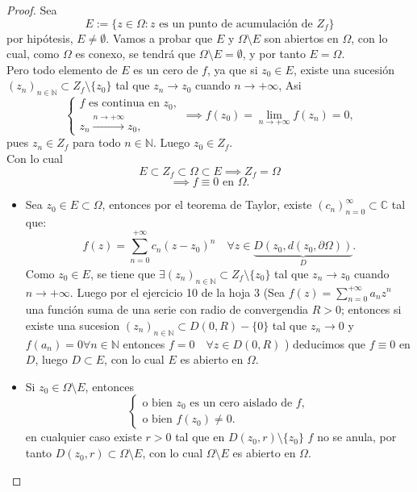 \begin{proof}
    Sea 
    \[
        E := \{z \in \Omega : z \text{ es un punto de acumulación de } Z_f \}
    \]
    por hipótesis, $E \neq \emptyset$. Vamos a probar que $E$ y $\Omega \setminus E$ son abiertos en $\Omega$, con lo cual, como $\Omega$ es conexo, se tendrá que $\Omega \setminus E = \emptyset$, y por tanto $E = \Omega$.\\
    Pero todo elemento de $E$ es un cero de $f$, ya que si $z_0 \in E$, existe una sucesión $(z_n)_{n \in \mathbb{N}} \subset Z_f \setminus \{ z_0 \}$ tal que $z_n \to z_0$ cuando $n \to +\infty$, Asi
    \[
        \begin{cases}
            f \text{ es continua en } z_0, \\
            z_n \xrightarrow{n \to +\infty} z_0, 
        \end{cases} \implies f(z_0) = \lim_{n \to +\infty} f(z_n) = 0,
    \]
    pues $z_n \in Z_f$ para todo $n \in \mathbb{N}$. Luego $z_0 \in Z_f$.\\
    Con lo cual 
    \[
        E \subset Z_f \subset \Omega \subset E \implies Z_f = \Omega
    \]
    \[
        \implies f \equiv 0 \text{ en } \Omega.
    \]
    \begin{itemize}
        \item Sea $z_0 \in E \subset \Omega$, entonces por el teorema de Taylor, existe $(c_n)_{n = 0}^{\infty} \subset \mathbb{C}$ tal que:
        \[
            f(z) = \sum_{n=0}^{+\infty} c_n (z - z_0)^n \quad \forall z \in \underbrace{D(z_0, d(z_0, \partial \Omega))}_{D}.
        \]
        Como $z_0 \in E$, se tiene que $\exists (z_n)_{n \in \mathbb{N}} \subset Z_f \setminus \{ z_0 \}$ tal que $z_n \to z_0$ cuando $n \to +\infty$. Luego por el ejercicio 10 de la hoja 3 (Sea $f(z)=\sum_{n=0}^{+\infty} a_n z^n$ una función suma de una serie con radio de convergendia $R>0$; entonces si existe una sucesion $(z_n)_{n \in \mathbb{N}} \subset D(0,R)-\{0\}$ tal que $z_n \rightarrow 0$ y $f(a_n)=0 \forall n\in \mathbb{N}$ entonces $f=0 \quad \forall z \in D(0,R)$ ) deducimos que $f \equiv 0$ en $D$, luego $D \subset E$, con lo cual $E$ es abierto en $\Omega$.
        \item Si $z_0 \in \Omega \setminus E$, entonces
        \[
            \begin{cases}
                \text{o bien } z_0 \text{ es un cero aislado de } f, \\
                \text{o bien } f(z_0) \neq 0.
            \end{cases}
        \]
        en cualquier caso existe $r > 0$ tal que en $D(z_0, r) \setminus \{ z_0 \}$ $f$ no se anula, por tanto $D(z_0, r) \subset \Omega \setminus E$, con lo cual $\Omega \setminus E$ es abierto en $\Omega$.
    \end{itemize}
\end{proof}

